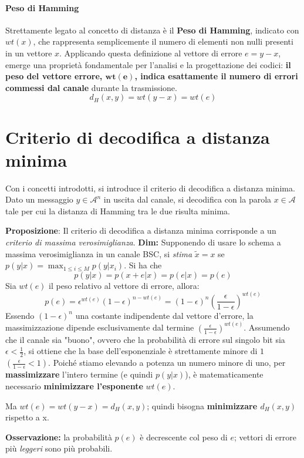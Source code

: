 \paragraph{Peso di Hamming}
Strettamente legato al concetto di distanza è il \textbf{Peso di Hamming}, indicato con $wt(x)$, che rappresenta semplicemente il numero di elementi non nulli presenti in un vettore $x$.
Applicando questa definizione al vettore di errore $e = y - x$, emerge una proprietà fondamentale per l'analisi e la progettazione dei codici: \textbf{il peso del vettore errore, $\boldsymbol{wt(e)}$, indica esattamente il numero di errori commessi dal canale} durante la trasmissione.
\[ d_H(x,y) = wt(y - x) = wt(e) \]

\section{Criterio di decodifica a distanza minima}
Con i concetti introdotti, si introduce il criterio di decodifica a distanza minima.
Dato un messaggio $y \in \mathcal{A}^n$ in uscita dal canale, si decodifica con la parola $x \in \mathcal{A}$ tale per cui la distanza di Hamming tra le due risulta minima.

\textbf{Proposizione}: Il criterio di decodifica a distanza minima corrisponde a un \textit{criterio di massima verosimiglianza}.
\textbf{Dim:}
Supponendo di usare lo schema a massima verosimiglianza in un canale BSC, si \textit{stima} $\tilde{x}=x$ se $p(y|x)= \max_{1\leq i \leq M}{p(y|x_i)}$. Si ha che
\[p(y|x)= p(x + e|x)=p(e|x)= p(e)\]
Sia $wt(e)$ il peso relativo al vettore di errore, allora:
\[p(e) = \epsilon^{wt(e)}(1 - \epsilon)^{n -wt(e)}= (1-\epsilon)^n \left(\frac{\epsilon}{1-\epsilon}\right)^{wt(e)}\]
Essendo $(1- \epsilon)^n$ una costante indipendente dal vettore d'errore, la massimizzazione dipende esclusivamente dal termine $\left(\frac{\epsilon}{1-\epsilon}\right)^{wt(e)}$.
Assumendo che il canale sia "buono", ovvero che la probabilità di errore sul singolo bit sia $\epsilon < \frac{1}{2}$, si ottiene che la base dell'esponenziale è strettamente minore di $1$ $\left(\frac{\epsilon}{1-\epsilon} < 1\right)$. 
Poiché stiamo elevando a potenza un numero minore di uno, per \textbf{massimizzare} l'intero termine (e quindi $p(y|x)$), è matematicamente necessario \textbf{minimizzare l'esponente} $wt(e)$.

Ma $wt(e) = wt(y-x) = d_{H}(x,y)$; quindi bisogna \textbf{minimizzare $d_H(x,y)$} rispetto a x.

\textbf{Osservazione:} la probabilità $p(e)$ è decrescente col peso di $e$; vettori di errore più \textit{leggeri} sono più probabili.

